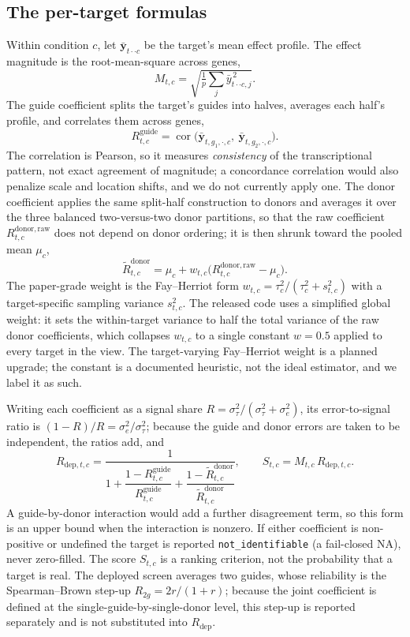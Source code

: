 \documentclass[11pt]{article}
\begin{document}
\subsection{The per-target formulas}

Within condition $c$, let $\bar{\mathbf y}_{t\cdot\cdot c}$ be the target's mean
effect profile. The effect magnitude is the root-mean-square across genes,
\[
M_{t,c} = \sqrt{\tfrac{1}{p}\textstyle\sum_{j} \bar y_{t\cdot\cdot c,j}^{\,2}}.
\]
The guide coefficient splits the target's guides into halves, averages each half's
profile, and correlates them across genes,
\[
R^{\mathrm{guide}}_{t,c}
 = \operatorname{cor}\!\big(\bar{\mathbf y}_{t,g_1,\cdot,c},\ \bar{\mathbf y}_{t,g_2,\cdot,c}\big).
\]
The correlation is Pearson, so it measures \emph{consistency} of the transcriptional
pattern, not exact agreement of magnitude; a concordance correlation would also
penalize scale and location shifts, and we do not currently apply one. The donor
coefficient applies the same split-half construction to donors and averages it over
the three balanced two-versus-two donor partitions, so that the raw coefficient
$R^{\mathrm{donor,raw}}_{t,c}$ does not depend on donor ordering; it is then shrunk
toward the pooled mean $\mu_c$,
\[
\widetilde R^{\mathrm{donor}}_{t,c}
 = \mu_c + w_{t,c}\big(R^{\mathrm{donor,raw}}_{t,c}-\mu_c\big).
\]
The paper-grade weight is the Fay--Herriot form $w_{t,c}=\tau_c^2/(\tau_c^2+s_{t,c}^2)$
with a target-specific sampling variance $s_{t,c}^2$. The released code uses a
simplified global weight: it sets the within-target variance to half the total
variance of the raw donor coefficients, which collapses $w_{t,c}$ to a single
constant $w=0.5$ applied to every target in the view. The target-varying
Fay--Herriot weight is a planned upgrade; the constant is a documented heuristic,
not the ideal estimator, and we label it as such.

Writing each coefficient as a signal share $R=\sigma^2_\tau/(\sigma^2_\tau+\sigma^2_e)$,
its error-to-signal ratio is $(1-R)/R=\sigma^2_e/\sigma^2_\tau$; because the guide and
donor errors are taken to be independent, the ratios add, and
\[
R_{\mathrm{dep},t,c} = \frac{1}{1
  + \dfrac{1-R^{\mathrm{guide}}_{t,c}}{R^{\mathrm{guide}}_{t,c}}
  + \dfrac{1-\widetilde R^{\mathrm{donor}}_{t,c}}{\widetilde R^{\mathrm{donor}}_{t,c}}},
\qquad
S_{t,c} = M_{t,c}\,R_{\mathrm{dep},t,c}.
\]
A guide-by-donor interaction would add a further disagreement term, so this form is
an upper bound when the interaction is nonzero. If either coefficient is
non-positive or undefined the target is reported \texttt{not\_identifiable} (a
fail-closed NA), never zero-filled. The score $S_{t,c}$ is a ranking criterion, not
the probability that a target is real. The deployed screen averages two guides,
whose reliability is the Spearman--Brown step-up $R_{2g}=2r/(1+r)$; because the joint
coefficient is defined at the single-guide-by-single-donor level, this step-up is
reported separately and is not substituted into $R_{\mathrm{dep}}$.
\end{document}
